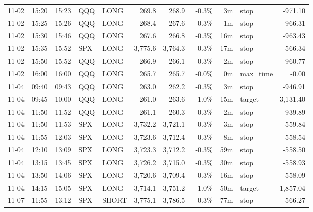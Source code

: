 \documentclass[11pt,a4paper,twoside]{article}
\begin{document}
\begin{center}
\begin{longtable}{>{\color{txtmain}}l l l l l r r r r >{\color{txtmain}}l r}
11-02 & 15:20 & 15:23 & QQQ & LONG & 269.8 & 268.9 & \textcolor{lossred}{-0.3\%} & 3m & stop & \textcolor{lossred}{-971.10} \\
11-02 & 15:25 & 15:26 & QQQ & LONG & 268.4 & 267.6 & \textcolor{lossred}{-0.3\%} & 1m & stop & \textcolor{lossred}{-966.31} \\
11-02 & 15:30 & 15:46 & QQQ & LONG & 267.6 & 266.8 & \textcolor{lossred}{-0.3\%} & 16m & stop & \textcolor{lossred}{-963.43} \\
11-02 & 15:35 & 15:52 & SPX & LONG & 3,775.6 & 3,764.3 & \textcolor{lossred}{-0.3\%} & 17m & stop & \textcolor{lossred}{-566.34} \\
11-02 & 15:50 & 15:52 & QQQ & LONG & 266.9 & 266.1 & \textcolor{lossred}{-0.3\%} & 2m & stop & \textcolor{lossred}{-960.77} \\
11-02 & 16:00 & 16:00 & QQQ & LONG & 265.7 & 265.7 & \textcolor{lossred}{-0.0\%} & 0m & max\_time & \textcolor{lossred}{-0.00} \\
11-04 & 09:40 & 09:43 & QQQ & LONG & 263.0 & 262.2 & \textcolor{lossred}{-0.3\%} & 3m & stop & \textcolor{lossred}{-946.91} \\
11-04 & 09:45 & 10:00 & QQQ & LONG & 261.0 & 263.6 & \textcolor{wingreen}{+1.0\%} & 15m & target & \textcolor{wingreen}{3,131.40} \\
11-04 & 11:50 & 11:52 & QQQ & LONG & 261.1 & 260.3 & \textcolor{lossred}{-0.3\%} & 2m & stop & \textcolor{lossred}{-939.89} \\
11-04 & 11:50 & 11:53 & SPX & LONG & 3,732.2 & 3,721.1 & \textcolor{lossred}{-0.3\%} & 3m & stop & \textcolor{lossred}{-559.84} \\
11-04 & 11:55 & 12:03 & SPX & LONG & 3,723.6 & 3,712.4 & \textcolor{lossred}{-0.3\%} & 8m & stop & \textcolor{lossred}{-558.54} \\
11-04 & 12:10 & 13:09 & SPX & LONG & 3,723.3 & 3,712.2 & \textcolor{lossred}{-0.3\%} & 59m & stop & \textcolor{lossred}{-558.50} \\
11-04 & 13:15 & 13:45 & SPX & LONG & 3,726.2 & 3,715.0 & \textcolor{lossred}{-0.3\%} & 30m & stop & \textcolor{lossred}{-558.93} \\
11-04 & 13:50 & 14:06 & SPX & LONG & 3,720.6 & 3,709.4 & \textcolor{lossred}{-0.3\%} & 16m & stop & \textcolor{lossred}{-558.09} \\
11-04 & 14:15 & 15:05 & SPX & LONG & 3,714.1 & 3,751.2 & \textcolor{wingreen}{+1.0\%} & 50m & target & \textcolor{wingreen}{1,857.04} \\
11-07 & 11:55 & 13:12 & SPX & SHORT & 3,775.1 & 3,786.5 & \textcolor{lossred}{-0.3\%} & 77m & stop & \textcolor{lossred}{-566.27} \\

\end{longtable}
\end{center}
\end{document}

